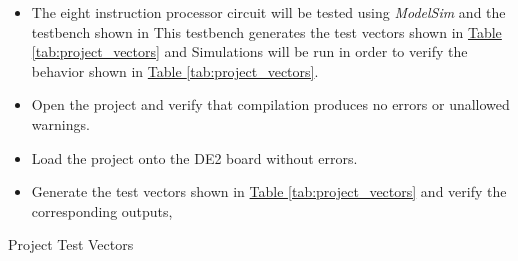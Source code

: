 \begin{itemize}
    \item The eight instruction processor circuit will be tested using \emph{ModelSim} and the testbench shown in %
    This testbench generates the test vectors shown in \hyperref[tab:project_vectors]{Table \ref*{tab:project_vectors}} and %
    Simulations will be run in order to verify the behavior shown in \hyperref[tab:project_vectors]{Table \ref*{tab:project_vectors}}.
    \item Open the project and verify that compilation produces no errors or unallowed warnings.
    \item Load the project onto the DE2 board without errors.
    \item Generate the test vectors shown in \hyperref[tab:project_vectors]{Table \ref*{tab:project_vectors}} and verify the corresponding outputs,%
\end{itemize}

\begin{table}[htbp]
    \centering
    \caption{Project Test Vectors\label{tab:project_vectors}}
\end{table}

